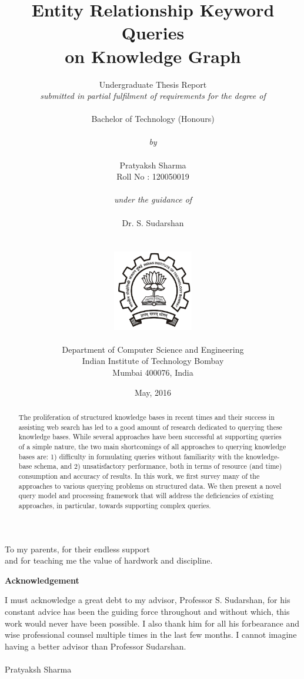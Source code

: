 \documentclass[a4paper, twoside, 12pt]{report}
\title{\textbf{Entity Relationship Keyword Queries \\ on Knowledge Graph}}
\author{Undergraduate Thesis Report \\ \emph{submitted in partial fulfilment of requirements for the degree of}\\
        \\
        {Bachelor of Technology (Honours)}\\
        \\
        \emph{by}\\
        \\
		{Pratyaksh Sharma}\\
        {Roll No : 120050019}\\
        \\
        \emph{under the guidance of}\\
        \\
		{Dr. S. Sudarshan}\\
        \\\\
        \includegraphics[height=3.5cm]{iitb_logo.jpg}\\
        \\
		{Department of Computer Science and Engineering}\\
        {Indian Institute of Technology Bombay}\\
        {Mumbai 400076, India}\\
}
\date{May, 2016}
\makeatletter
\newcommand\blankpage{%
    \null
    \thispagestyle{empty}%
    \addtocounter{page}{-1}%
    \newpage}
\newenvironment{dedication}
  {\clearpage           %
   \thispagestyle{empty}%
   \vspace*{\stretch{1}}%
   \itshape             %
   \center          %
  }
  {\par %
   \vspace{\stretch{3}} %
   \clearpage           %
}
\newcommand\frontmatter{%
    \cleardoublepage
  \pagenumbering{roman}}
\makeatother
\begin{document}
\frontmatter
\linespread{1}

\maketitle


\begin{dedication}
To my parents, for their endless support \\
and for teaching me the value of hardwork and discipline.
\end{dedication}




\renewcommand{\abstractname}{Abstract}
\begin{abstract}
  The proliferation of structured knowledge bases in recent times and their success in assisting web search has led to a good amount of research dedicated to querying these knowledge bases. While several approaches have been successful at supporting queries of a simple nature, the two main shortcomings of all approaches to querying knowledge bases are: 1) difficulty in formulating queries without familiarity with the knowledge-base schema, and 2) unsatisfactory performance, both in terms of resource (and time) consumption and accuracy of results. In this work, we first survey many of the approaches to various querying problems on structured data. We then present a novel query model and processing framework that will address the deficiencies of existing approaches, in particular, towards supporting complex queries.

\end{abstract}



\clearpage
\thispagestyle{empty}
\vspace*{\fill}
\vspace{-5cm}
\begin{center}
\bf{Acknowledgement}
\end{center}
I must acknowledge a great debt to my advisor, Professor S. Sudarshan, for his constant advice has been the guiding force throughout and without which, this work would never have been possible. I also thank him for all his forbearance and wise professional counsel multiple times in the last few months. I cannot imagine having a better advisor than Professor Sudarshan.
\\ \\
Pratyaksh Sharma
\vspace*{\fill}
\end{document}
